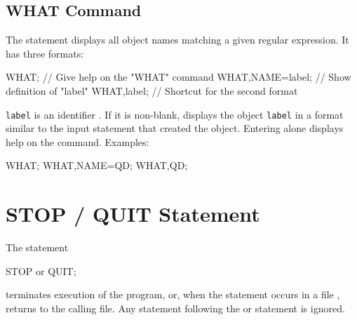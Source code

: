 \subsection{WHAT Command}
\label{sec:what}
The  statement displays all object names matching a given
regular expression.
It has three formats:
\begin{example}
WHAT;                   // Give help on the "WHAT" command
WHAT,NAME=label;        // Show definition of "label"
WHAT,label;             // Shortcut for the second format
\end{example}
\texttt{label} is an {identifier} .
If it is non-blank,
\opal displays the object \texttt{label} in a format similar to the
input statement that created the object.
Entering  alone displays help on the 
command.
\noindent Examples:
\begin{example}
WHAT;
WHAT,NAME=QD;
WHAT,QD;
\end{example}

\section{STOP / QUIT Statement}
\label{sec:stop}
The statement
\begin{example}
STOP or QUIT;
\end{example}
terminates execution of the \opal program,
or, when the statement occurs in a  file ,
returns to the calling file.
Any statement following the  or   statement is ignored.

